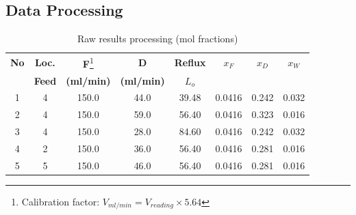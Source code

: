 \subsection{Data Processing}

\begin{table}[H]
    \centering
    \caption{Raw results processing (mol fractions)}
    \label{tab:processing}
    \begin{tabular}{cccccccc}
        \toprule
        \textbf{No} & \textbf{Loc.} & \textbf{F}\footnote{Calibration factor: $V_{ml/min} = V_{reading} \times 5.64$} & \textbf{D}       & \textbf{Reflux} & \textbf{$x_F$} & \textbf{$x_D$} & \textbf{$x_W$} \\
                    & \textbf{Feed} & \textbf{(ml/min)} & \textbf{(ml/min)} & \textbf{$L_o$}  &                &                &                \\
        \midrule
        1           & 4             & 150.0             & 44.0             & 39.48           & 0.0416         & 0.242          & 0.032          \\
        2           & 4             & 150.0             & 59.0             & 56.40           & 0.0416         & 0.323          & 0.016          \\
        3           & 4             & 150.0             & 28.0             & 84.60           & 0.0416         & 0.242          & 0.032          \\
        4           & 2             & 150.0             & 36.0             & 56.40           & 0.0416         & 0.281          & 0.016          \\
        5           & 5             & 150.0             & 46.0             & 56.40           & 0.0416         & 0.281          & 0.016          \\
        \bottomrule
    \end{tabular}
\end{table}

